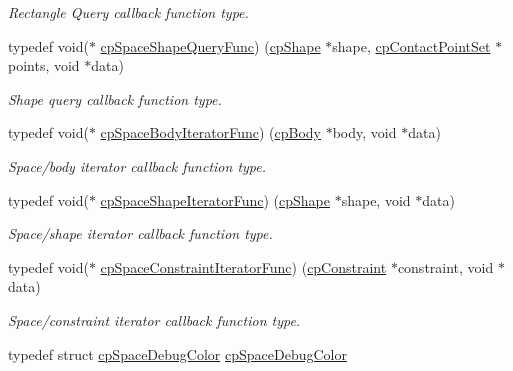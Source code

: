 \begin{DoxyCompactItemize}
\begin{DoxyCompactList}\small\item\em Rectangle Query callback function type. \end{DoxyCompactList}\item 
\hypertarget{group__cp_space_gab124952dd71dea36688f6ff6ff8bdcb2}{}typedef void($\ast$ \hyperlink{group__cp_space_gab124952dd71dea36688f6ff6ff8bdcb2}{cp\+Space\+Shape\+Query\+Func}) (\hyperlink{structcp_shape}{cp\+Shape} $\ast$shape, \hyperlink{structcp_contact_point_set}{cp\+Contact\+Point\+Set} $\ast$points, void $\ast$data)\label{group__cp_space_gab124952dd71dea36688f6ff6ff8bdcb2}

\begin{DoxyCompactList}\small\item\em Shape query callback function type. \end{DoxyCompactList}\item 
\hypertarget{group__cp_space_ga2870b1128c5bfe79cb261d269abdea64}{}typedef void($\ast$ \hyperlink{group__cp_space_ga2870b1128c5bfe79cb261d269abdea64}{cp\+Space\+Body\+Iterator\+Func}) (\hyperlink{structcp_body}{cp\+Body} $\ast$body, void $\ast$data)\label{group__cp_space_ga2870b1128c5bfe79cb261d269abdea64}

\begin{DoxyCompactList}\small\item\em Space/body iterator callback function type. \end{DoxyCompactList}\item 
\hypertarget{group__cp_space_gafae017c9a8a7c082032035bf165e4ec9}{}typedef void($\ast$ \hyperlink{group__cp_space_gafae017c9a8a7c082032035bf165e4ec9}{cp\+Space\+Shape\+Iterator\+Func}) (\hyperlink{structcp_shape}{cp\+Shape} $\ast$shape, void $\ast$data)\label{group__cp_space_gafae017c9a8a7c082032035bf165e4ec9}

\begin{DoxyCompactList}\small\item\em Space/shape iterator callback function type. \end{DoxyCompactList}\item 
\hypertarget{group__cp_space_ga0bf20ed2411342352dc43b71c60649c1}{}typedef void($\ast$ \hyperlink{group__cp_space_ga0bf20ed2411342352dc43b71c60649c1}{cp\+Space\+Constraint\+Iterator\+Func}) (\hyperlink{structcp_constraint}{cp\+Constraint} $\ast$constraint, void $\ast$data)\label{group__cp_space_ga0bf20ed2411342352dc43b71c60649c1}

\begin{DoxyCompactList}\small\item\em Space/constraint iterator callback function type. \end{DoxyCompactList}\item 
\hypertarget{group__cp_space_gafc46fcefca8c28112ca8245eef00bae7}{}typedef struct \hyperlink{structcp_space_debug_color}{cp\+Space\+Debug\+Color} \hyperlink{group__cp_space_gafc46fcefca8c28112ca8245eef00bae7}{cp\+Space\+Debug\+Color}\label{group__cp_space_gafc46fcefca8c28112ca8245eef00bae7}


\end{DoxyCompactItemize}
